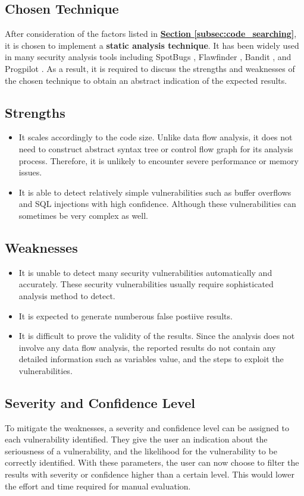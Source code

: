 \documentclass[12pt, a4paper]{report}
\begin{document}
\subsection{Chosen Technique}
After consideration of the factors listed in \hyperref[subsec:code_searching]{\textbf{Section
\ref*{subsec:code_searching}}}, it is chosen to implement a \textbf{static analysis technique}. It
has been widely used in many security analysis tools including SpotBugs \cite{spotbugs}, Flawfinder
\cite{flawfinder}, Bandit \cite{bandit}, and Progpilot \cite{progpilot}. As a result, it is required
to discuss the strengths and weaknesses of the chosen technique to obtain an abstract indication of
the expected results.

\subsection*{Strengths}
\begin{itemize}
  \item It scales accordingly to the code size. Unlike data flow analysis, it does not need to
  construct abstract syntax tree or control flow graph for its analysis process. Therefore, it is
  unlikely to encounter severe performance or memory issues.
  \item It is able to detect relatively simple vulnerabilities such as buffer overflows and SQL
  injections with high confidence. Although these vulnerabilities can sometimes be very  complex as
  well.
\end{itemize}

\subsection*{Weaknesses}
\begin{itemize}
  \item It is unable to detect many security vulnerabilities automatically and accurately. These
  security vulnerabilities usually require sophisticated analysis method to detect.
  \item It is expected to generate numberous false postiive results.
  \item It is difficult to prove the validity of the results. Since the analysis does not involve
  any data flow analysis, the reported results do not contain any detailed information such as
  variables value, and the steps to exploit the vulnerabilities.
\end{itemize}

\subsection{Severity and Confidence Level}
To mitigate the weaknesses, a severity and confidence level can be assigned to each vulnerability
identified. They give the user an indication about the seriousness of a vulnerability, and the
likelihood for the vulnerability to be correctly identified. With these parameters, the user can now
choose to filter the results with severity or confidence higher than a certain level. This would
lower the effort and time required for manual evaluation.
\end{document}
